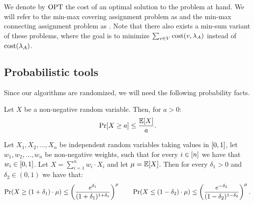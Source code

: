 
We denote by $\textnormal{OPT}$ the cost of an optimal solution to the problem at hand. We will refer to the min-max covering assignment problem as \coverage and the min-max connecting assignment problem as \connectivity. Note that there also exists a min-sum variant of these problems, where the goal is to minimize $\sum_{v\in V} \textnormal{cost}\mathopen{}\left( v, \lambda_A \right)$ instead of $\textnormal{cost}\mathopen{}\left( \lambda_A \right)$.
\subsection{Probabilistic tools}

Since our algorithms are randomized, we will need the following probability facts. 
\begin{theorem}
Let $X$ be a non-negative random variable. Then, for $a > 0$:
\[
    \Pr\mathopen{}\left[ X \geq a \right] \leq \frac{\mathbb{E}\mathopen{}\left[ X \right]}{a}.
\]
\end{theorem}


\begin{theorem}
    Let $X_1, X_2, \dots, X_n$ be independent random variables taking values in $\mathopen{}\left[ 0,1 \right]$, let $w_1, w_2, \dots, w_n$ be non-negative weights, such that for every $i\in \mathopen{}\left[ n \right]$ we have that $w_i\in \mathopen{}\left[ 0,1 \right]$. Let $X=\sum_{i=1}^{n} w_i\cdot X_i$ and let $\mu = \mathbb{E}\!\left[X\right]$. Then for every $\delta_1 > 0$ and $\delta_2 \in (0,1)$ we have that:
    \[
        \Pr\mathopen{}\left( X \geq (1+\delta_1)\cdot \mu \right) \leq \mathopen{}\left( \frac{e^{\delta_1}}{(1+\delta_1)^{1+\delta_1}} \right)^\mu
        \qquad
        \Pr\mathopen{}\left( X \leq (1-\delta_2)\cdot \mu \right) \leq \mathopen{}\left( \frac{e^{-\delta_2}}{(1-\delta_2)^{1-\delta_2}} \right)^\mu.
    \]
\end{theorem}

